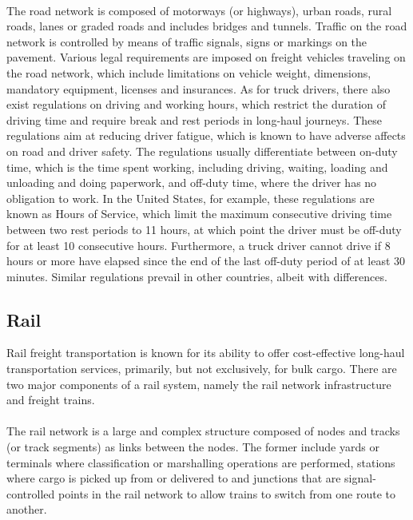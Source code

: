 \paragraph{}
The road network is composed of motorways (or highways), urban roads,
rural roads, lanes or graded roads and includes bridges and tunnels. Traffic on the road network is controlled by means of traffic signals, signs or markings on the pavement. Various legal requirements are imposed on freight vehicles traveling on the road network, which include limitations on vehicle weight, dimensions, mandatory equipment, licenses and insurances. As for truck drivers, there also exist regulations on driving and working hours, which restrict the duration of driving time and require break and rest periods in long-haul journeys. These regulations aim at reducing driver fatigue, which is known to have adverse affects on road and driver safety. The regulations usually differentiate between on-duty time, which is the time spent working, including driving, waiting, loading and unloading and doing paperwork, and off-duty time, where the driver has no obligation to work. In the United States, for example, these regulations are known as Hours of Service, which limit the maximum consecutive driving time between two rest periods to 11 hours, at which point the driver must be off-duty for at least 10 consecutive hours. Furthermore, a truck driver cannot drive if 8 hours or more have elapsed since the end of the last off-duty period of at least 30 minutes. Similar regulations prevail in other countries, albeit with differences.
%
\subsection{Rail}
Rail freight transportation is known for its ability to offer cost-effective long-haul transportation services, primarily, but not exclusively, for bulk cargo. There are two major components of a rail system, namely the rail network infrastructure and freight trains.
\paragraph{}
The rail network is a large and complex structure composed of nodes and
tracks (or track segments) as links between the nodes. The former include yards or terminals where classification or marshalling operations are performed, stations where cargo is picked up from or delivered to and junctions that are signal-controlled points in the rail network to allow trains to switch from one route to another.
